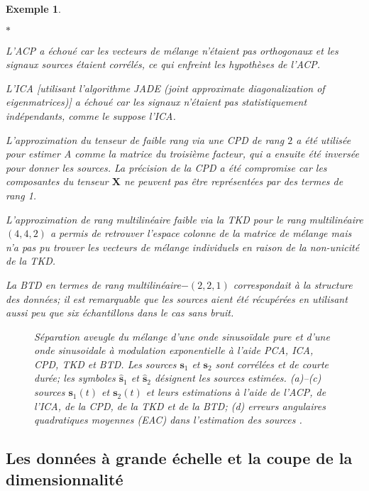 \documentclass[11pt,a4paper,oneside]{book}
\newtheorem{ex}{Exemple}[chapter]}
\newcommand{\encad}[1]{%
 \fbox{\begin{minipage}[t]{\linewidth}%
  #1\end{minipage}}}
\def\s{\mathbf s}
\newcommand{\mbf}[1]{\mathbf{#1}}
\begin{document}
\begin{ex}
\begin{list}{$ \ast $}{}
\item
L'ACP a échoué car les vecteurs de mélange n'étaient pas orthogonaux et les signaux sources étaient corrélés, ce qui enfreint les hypothèses de l'ACP.
\item
L'ICA [utilisant l'algorithme JADE (joint approximate diagonalization of eigenmatrices)] a échoué car les signaux n'étaient pas statistiquement indépendants, comme le suppose l'ICA.
\item
L'approximation du tenseur de faible rang via une CPD de rang $ 2 $ a été utilisée pour estimer A comme la matrice du troisième facteur, qui a ensuite été inversée pour donner les sources. La précision de la CPD a été compromise car les composantes du tenseur $ \mbf{X} $ ne peuvent pas être représentées par des termes de rang 1.
\item
L'approximation de rang multilinéaire faible via la TKD pour le rang multilinéaire $ (4, 4, 2) $ a permis de retrouver l'espace colonne de la matrice de mélange mais n'a pas pu trouver les vecteurs de mélange individuels en raison de la non-unicité de la TKD.
\item 
La BTD en termes de rang multilinéaire$ -(2, 2, 1) $ correspondait à la structure des données; il est remarquable que les sources aient été récupérées en utilisant aussi peu que six échantillons dans le cas sans bruit.
\end{list}

\begin{figure}[!h]
\encad{\centering
	\texttt{[image: "My figures/FIG318"]}}
	\caption{Séparation aveugle du mélange d'une onde sinusoïdale pure et d'une onde sinusoidale à modulation exponentielle à l'aide PCA, ICA, CPD, TKD et BTD. Les sources $ \s_{1} $ et $ \s_{2} $ sont corrélées et de courte durée; les symboles $ \hat{\s}_{1} $ et $ \hat{\s}_{2} $  désignent les sources estimées. (a)--(c) sources $ \s_{1}(t) $ et $ \s_{2}(t) $ et leurs estimations à l'aide de l'ACP, de l'ICA, de la CPD, de la TKD et de la BTD; (d) erreurs angulaires quadratiques moyennes (EAC) dans l'estimation des sources \cite[p.153]{cichocki2015tensor}.}
	\label{fig:fig318}
\end{figure}

\end{ex}

 

\subsection{Les données à grande échelle et la coupe de la dimensionnalité}
\end{document}
